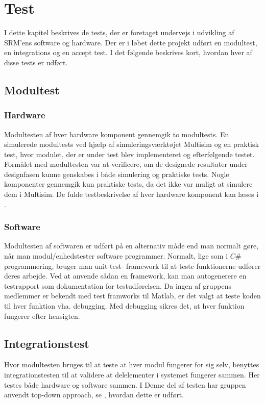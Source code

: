\chapter{Test}

I dette kapitel beskrives de tests, der er foretaget undervejs i udvikling af SRM'ens software og hardware. Der er i løbet dette projekt udført en modultest, en integrations og en accept test. I det følgende beskrives kort, hvordan hver af disse tests er udført. 


\section{Modultest} 
\subsection{Hardware}
Modultesten af hver hardware komponent gennemgik to modultests. En simulerede modultests ved hjælp af simuleringsværktøjet Multisim og en praktisk test, hvor modulet, der er under test blev implementeret og efterfølgende testet. Formålet med modultesten var at verificere, om de designede resultater under designfasen kunne genskabes i både simulering og praktiske tests. Nogle komponenter gennemgik kun praktiske tests, da det ikke var muligt at simulere dem i Multisim. De fulde testbeskrivelse af hver hardware komponent kan læses i . 
\subsection{Software}
Modultesten af softwaren er udført på en alternativ måde end man normalt gøre, når man modul/enhedstester software programmer. Normalt, lige som i $C\#$ programmering, bruger man unit-test- framework til at teste funktionerne udfører deres arbejde. Ved at anvende sådan en framework, kan man autogenerere en testrapport som dokumentation for testudførelsen. Da ingen af gruppens medlemmer er bekendt med test framworks til Matlab, er det valgt at teste koden til hver funktion vha. debugging. Med debugging sikres det, at hver funktion fungerer efter hensigten.


\section{Integrationstest}
Hvor modultesten bruges til at teste at hver modul fungerer for sig selv, benyttes integrationstesten til at validere at delelementer i systemet fungerer sammen. Her testes både hardware og software sammen.  I Denne del af testen har gruppen anvendt top-down approach, se , hvordan dette er udført.  

